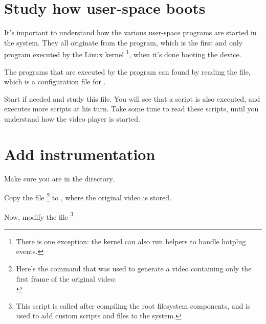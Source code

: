 \section{Study how user-space boots}

It's important to understand how the various user-space programs
are started in the system. They all originate from the 
program, which is the first and only program executed by the Linux
kernel \footnote{There is one exception: the kernel can also run
helpers to handle hotplug events.}, when it's done booting the device.

The programs that are executed by the  program can
found by reading the  file, which is a configuration
file for . 

Start  if needed and study this file. You will see that
a  script is also executed, and executes more
scripts at his turn. Take some time to read these scripts, until you
understand how the video player is started.

\section{Add instrumentation}

Make sure you are in the  directory.

Copy the  file 
\footnote {Here's the command that was used to generate a video
containing only the first frame of the original video: \\
}
to , where the original video is
stored.

Now, modify the  file 
\footnote{This script is called after compiling the root filesystem
components, and is used to add custom scripts and files to the system.} 


